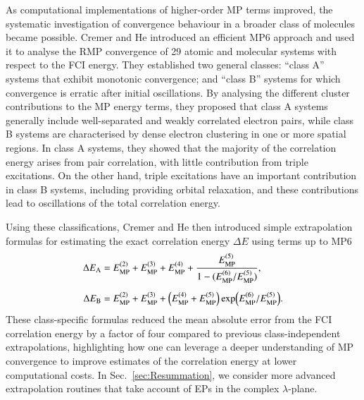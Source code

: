\documentclass[aps,prb,reprint,noshowkeys,superscriptaddress]{revtex4-1}
\newcommand{\Emp}{E_{\text{MP}}}
\begin{document}
As computational implementations of higher-order MP terms improved, the systematic investigation 
of convergence behaviour in a broader class of molecules became possible.
Cremer and He introduced an efficient MP6 approach and used it to analyse the RMP convergence of
29 atomic and molecular systems with respect to the FCI energy.\cite{Cremer_1996}
They established two general classes: ``class A'' systems that exhibit monotonic convergence; 
and ``class B'' systems for which convergence is erratic after initial oscillations. 
By analysing the different cluster contributions to the MP energy terms, they proposed that
class A systems generally include well-separated and weakly correlated electron pairs, while class B systems
are characterised by dense electron clustering in one or more spatial regions.\cite{Cremer_1996}
In class A systems, they showed that the majority of the correlation energy arises from pair correlation, 
with little contribution from triple excitations.
On the other hand, triple excitations have an important contribution in class B systems, including providing
orbital relaxation, and these contributions lead to oscillations of the total correlation energy.

Using these classifications, Cremer and He then introduced simple extrapolation formulas for estimating the 
exact correlation energy $\Delta E$ using terms up to MP6\cite{Cremer_1996}
\begin{subequations}
\begin{align}
\Delta E_{\text{A}}
    &= \Emp^{(2)} + \Emp^{(3)} + \Emp^{(4)}
     + \frac{\Emp^{(5)}}{1 - (\Emp^{(6)} / \Emp^{(5)})}, 
     \\[5pt]
\Delta E_{\text{B}} 
    &= \Emp^{(2)} + \Emp^{(3)} + \qty(\Emp^{(4)} + \Emp^{(5)}) \exp(\Emp^{(6)} / \Emp^{(5)}).
\end{align}
\end{subequations}
These class-specific formulas reduced the mean absolute error from the FCI correlation energy by a
factor of four compared to previous class-independent extrapolations,
highlighting how one can leverage a deeper understanding of MP convergence to improve estimates of 
the correlation energy at lower computational costs. 
In Sec.~\ref{sec:Resummation}, we consider more advanced extrapolation routines that take account of EPs in the complex $\lambda$-plane.
\end{document}
